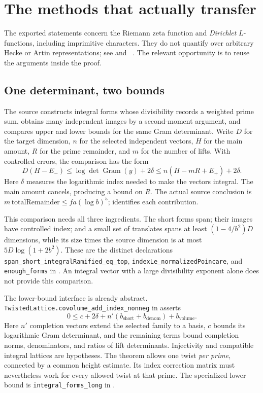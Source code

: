 \section{The methods that actually transfer}
\label{sec:source-architecture}

The exported statements concern the Riemann zeta function and
\emph{Dirichlet} $L$-functions, including imprimitive characters. They do not
quantify over arbitrary Hecke or Artin representations; see
 and
~\cite{upstream}.
The relevant opportunity is to reuse the arguments inside the proof.

\subsection{One determinant, two bounds}

The source constructs integral forms whose divisibility records a weighted
prime sum, obtains many independent images by a second-moment argument,
and compares upper and lower bounds for the same Gram determinant.
Write $D$ for the target dimension, $n$ for the selected independent
vectors, $H$ for the main amount, $R$ for the prime remainder, and $m$ for
the number of lifts. With controlled errors, the comparison has the form
\[
 D(H-E_-)\le \log\det\operatorname{Gram}(y)+2\delta
       \le n(H-mR+E_+)+2\delta.
\]
Here $\delta$ measures the logarithmic index needed to make the vectors
integral. The main amount cancels, producing a bound on $R$.
The actual source conclusion is
$m\,\mathrm{totalRemainder}\le fa(\log b)^5$;
identifies each contribution.

This comparison needs all three ingredients. The short forms span; their
images have controlled index; and a small set of translates spans at least
$(1-4/b^2)D$ dimensions, while its size times the source dimension is at
most $5D\log(1+2b^2)$. These are the distinct declarations
\texttt{span\_short\_integralRamified\_eq\_top},
\texttt{indexLe\_normalizedPoincare}, and \texttt{enough\_forms} in
.
An integral vector with a large divisibility exponent alone does not
provide this comparison.

The lower-bound interface is already abstract.
\texttt{TwistedLattice.covolume\_add\_index\_nonneg} in
asserts
\[
 0\le c+2\delta+n'(b_{\mathrm{short}}+b_{\mathrm{denom}})
                   +b_{\mathrm{volume}}.
\]
Here $n'$ completion vectors extend the selected family to a basis, $c$
bounds its logarithmic Gram determinant, and the remaining terms bound
completion norms, denominators, and ratios of lift determinants.
Injectivity and compatible integral lattices are hypotheses.
The theorem allows one twist \emph{per prime}, connected by a common height
estimate. Its index correction matrix must nevertheless work for every
allowed twist at that prime. The specialized lower bound is
\texttt{integral\_forms\_long} in
.

